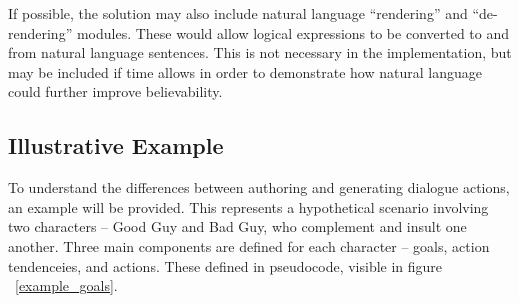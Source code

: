 \documentclass{article}
\begin{document}
If possible, the solution may also include natural language
``rendering'' and ``de-rendering'' modules.  These would allow logical
expressions to be converted to and from natural language sentences.
This is not necessary in the implementation, but may be included if
time allows in order to demonstrate how natural language could further
improve believability.

\subsection{Illustrative Example}

To understand the differences between authoring and generating
dialogue actions, an example will be provided.  This represents a
hypothetical scenario involving two characters -- Good Guy and Bad
Guy, who complement and insult one another.  Three main components are
defined for each character -- goals, action tendenceies, and
actions.  These defined in pseudocode, visible in figure
~\ref{example_goals}.
\end{document}
